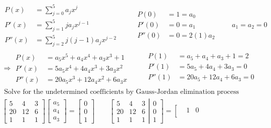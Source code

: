 \documentclass[twoside]{amsart}
\theoremstyle{plain}
\theoremstyle{definition}
\newcommand{\exercisehead}[1]
  {\smallskip
   \noindent{\small\bf Exercise #1.}}
\begin{document}
\exercisehead{2}
\[
\begin{gathered}
  \begin{aligned}
    P(x) & = \sum_{j=0}^5 a_j x^j \\
    P'(x) & = \sum_{j=1}^5 j a_j x^{j-1} \\
    P''(x) &  = \sum_{j=2}^5 j (j-1)a_j x^{j-2} 
  \end{aligned} \quad \quad \, 
  \begin{aligned}
    P(0) & = 1 = a_0 \\
    P'(0) & = 0 = a_1 \\
    P''(0) & = 0 = 2(1)a_2 
  \end{aligned}
 \quad \quad a_1 = a_2 = 0  \\
 \Longrightarrow 
\begin{aligned}
  P(x) & = a_5 x^5 + a_4 x^4 + a_3 x^3 + 1 \\
  P'(x) & = 5a_5 x^4 + 4a_4 x^3 + 3a_3 x^2  \\
  P''(x) & = 20a_5 x^3 + 12a_4 x^2 + 6a_3 x 
\end{aligned} \quad \quad \, 
\begin{aligned}
  P(1) & = a_5  + a_4  + a_3  + 1 =2 \\
  P'(1) & = 5a_5  + 4 a_4  + 3a_3  =0  \\
  P''(1) & = 20a_5  + 12a_4  + 6a_3  = 0  \\
\end{aligned} \\
\text{ Solve for the undetermined coefficients by Gauss-Jordan elimination process } \\
\left[ \begin{matrix} 
5 & 4 & 3 \\
20 & 12 & 6 \\
1 & 1 & 1 
\end{matrix} \right] \left[ 
  \begin{matrix}
    a_5 \\
    a_4 \\
    a_3 
\end{matrix} 
\right] = \left[ \begin{matrix} 
    0 \\
    0 \\
    1
\end{matrix}
\right]
\quad \quad 
\left[ \begin{matrix} 5 & 4 & 3 \\ 
 20 & 12 & 6 \\
 1 & 1 & 1 
\end{matrix} \right| \left. \begin{matrix} 0 \\ 0 \\ 1 \end{matrix} \right] = \left[ \begin{matrix} & 1 & 0 \\

\end{matrix}
\end{gathered}\]
\end{document}
